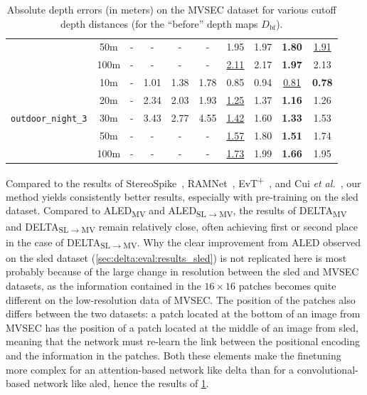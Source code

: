 \begin{table}[ht]
{\begin{tabular}{@{}cccccccccc@{}}
      & 50m & - & - & - & - & 1.95 & 1.97 & \textbf{1.80} & \underline{1.91} \\
      & 100m & - & - & - & - & \underline{2.11} & 2.17 & \textbf{1.97} & 2.13 \\
      \midrule
      \multirow{5}{*}{\Verb|outdoor_night_3|} & 10m & - & 1.01 & 1.38 & 1.78 & 0.85 & 0.94 & \underline{0.81} & \textbf{0.78} \\
      & 20m & - & 2.34 & 2.03 & 1.93 & \underline{1.25} & 1.37 & \textbf{1.16} & 1.26 \\
      & 30m & - & 3.43 & 2.77 & 4.55 & \underline{1.42} & 1.60 & \textbf{1.33} & 1.53 \\
      & 50m & - & - & - & - & \underline{1.57} & 1.80 & \textbf{1.51} & 1.74 \\
      & 100m & - & - & - & - & \underline{1.73} & 1.99 & \textbf{1.66} & 1.95 \\
      \bottomrule
    \end{tabular}
  }
  \caption{Absolute depth errors (in meters) on the MVSEC dataset for various cutoff depth distances (for the ``before'' depth maps \(D_\text{bf}\)).}\label{tab:delta:results_mvsec}
\end{table}

Compared to the results of StereoSpike~\cite{Ranon2021StereoSpikeDL}, RAMNet~\cite{Gehrig2021CombiningEA}, EvT\textsuperscript{+}~\cite{Sabater2022EventTA+}, and Cui \textit{et al.}~\cite{Cui2022DenseDE}, our method yields consistently better results, especially with pre-training on the \acrshort{sled} dataset. Compared to ALED\textsubscript{MV} and ALED\textsubscript{SL\(\rightarrow\)MV}, the results of DELTA\textsubscript{MV} and DELTA\textsubscript{SL\(\rightarrow\)MV} remain relatively close, often achieving first or second place in the case of DELTA\textsubscript{SL\(\rightarrow\)MV}. Why the clear improvement from ALED observed on the \acrshort{sled} dataset (\cref{sec:delta:eval:results_sled}) is not replicated here is most probably because of the large change in resolution between the \acrshort{sled} and MVSEC datasets, as the information contained in the \(16 \times 16\) patches becomes quite different on the low-resolution data of MVSEC. The position of the patches also differs between the two datasets: a patch located at the bottom of an image from MVSEC has the position of a patch located at the middle of an image from \acrshort{sled}, meaning that the network must re-learn the link between the positional encoding and the information in the patches. Both these elements make the finetuning more complex for an attention-based network like \acrshort{delta} than for a convolutional-based network like \acrshort{aled}, hence the results of \cref{tab:delta:results_mvsec}.

